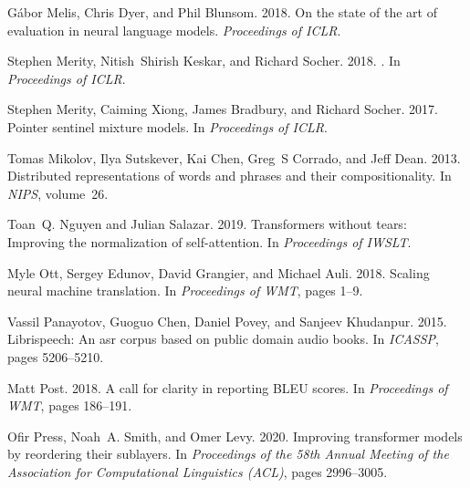 \documentclass[11pt]{article}
\begin{document}
\begin{thebibliography}{37}
G{\'{a}}bor Melis, Chris Dyer, and Phil Blunsom. 2018.
\newblock On the state of the art of evaluation in neural language models.
\newblock \emph{Proceedings of ICLR}.

Stephen Merity, Nitish~Shirish Keskar, and Richard Socher. 2018.
.
\newblock In \emph{Proceedings of ICLR}.

Stephen Merity, Caiming Xiong, James Bradbury, and Richard Socher. 2017.
\newblock Pointer sentinel mixture models.
\newblock In \emph{Proceedings of ICLR}.

Tomas Mikolov, Ilya Sutskever, Kai Chen, Greg~S Corrado, and Jeff Dean. 2013.
\newblock Distributed representations of words and phrases and their
  compositionality.
\newblock In \emph{NIPS}, volume~26.

Toan~Q. Nguyen and Julian Salazar. 2019.
\newblock Transformers without tears: Improving the normalization of
  self-attention.
\newblock In \emph{Proceedings of IWSLT}.

Myle Ott, Sergey Edunov, David Grangier, and Michael Auli. 2018.
\newblock Scaling neural machine translation.
\newblock In \emph{Proceedings of WMT}, pages 1--9.

Vassil Panayotov, Guoguo Chen, Daniel Povey, and Sanjeev Khudanpur. 2015.
\newblock Librispeech: An asr corpus based on public domain audio books.
\newblock In \emph{ICASSP}, pages 5206--5210.

Matt Post. 2018.
\newblock A call for clarity in reporting {BLEU} scores.
\newblock In \emph{Proceedings of WMT}, pages 186--191.

Ofir Press, Noah~A. Smith, and Omer Levy. 2020.
\newblock Improving transformer models by reordering their sublayers.
\newblock In \emph{Proceedings of the 58th Annual Meeting of the Association
  for Computational Linguistics (ACL)}, pages 2996--3005.


\end{thebibliography}
\end{document}
